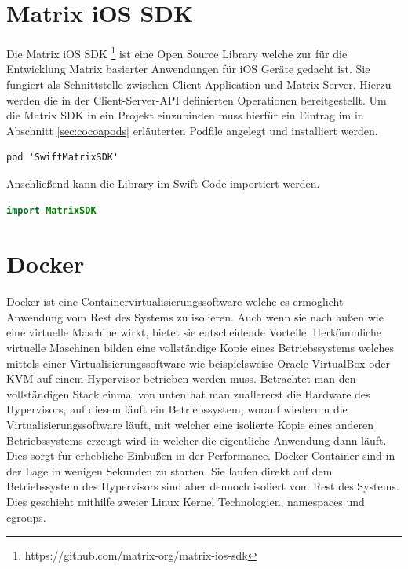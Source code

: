     \section{Matrix iOS SDK}\label{sec:matrix-sdk}
    Die Matrix iOS SDK \footnote{https://github.com/matrix-org/matrix-ios-sdk} ist eine Open Source Library welche zur für die Entwicklung Matrix basierter Anwendungen für iOS Geräte gedacht ist.
    Sie fungiert als Schnittstelle zwischen Client Application und Matrix Server.
    Hierzu werden die in der Client-Server-API definierten Operationen bereitgestellt.
    Um die Matrix SDK in ein Projekt einzubinden muss hierfür ein Eintrag im in Abschnitt \ref{sec:cocoapods} erläuterten Podfile angelegt und installiert werden.
    ~\cite{matrixiossdk}
    \begin{lstlisting}[language={},label={lst:matrtix-sdk}]
        pod 'SwiftMatrixSDK'
    \end{lstlisting}
    Anschließend kann die Library im Swift Code importiert werden.
    \begin{lstlisting}[language=swift,label={lst:matrtix-sdk-swift}]
        import MatrixSDK
    \end{lstlisting}

    \section{Docker}\label{sec:docker}
    Docker ist eine Containervirtualisierungssoftware welche es ermöglicht Anwendung vom Rest des Systems zu isolieren.
    Auch wenn sie nach außen wie eine virtuelle Maschine wirkt, bietet sie entscheidende Vorteile.
    Herkömmliche virtuelle Maschinen bilden eine vollständige Kopie eines Betriebssystems welches mittels einer Virtualisierungssoftware wie beispielsweise Oracle VirtualBox oder KVM auf einem Hypervisor betrieben werden muss.
    Betrachtet man den vollständigen Stack einmal von unten hat man zuallererst die Hardware des Hypervisors, auf diesem läuft ein Betriebssystem, worauf wiederum die Virtualisierungssoftware läuft, mit welcher eine isolierte Kopie eines anderen Betriebssystems erzeugt wird in welcher die eigentliche Anwendung dann läuft.
    Dies sorgt für erhebliche Einbußen in der Performance.
    Docker Container sind in der Lage in wenigen Sekunden zu starten.
    Sie laufen direkt auf dem Betriebssystem des Hypervisors sind aber dennoch isoliert vom Rest des Systems.
    Dies geschieht mithilfe zweier Linux Kernel Technologien, namespaces und cgroups.
    ~\cite{docker}

